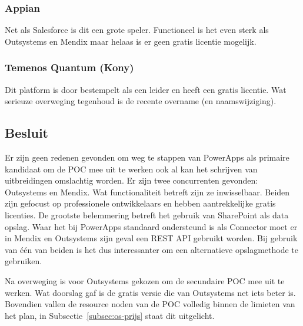 \subsubsection{Appian}

Net als Salesforce is dit een grote speler. Functioneel is het even sterk als Outsystems en Mendix maar helaas is er geen gratis licentie mogelijk.

\subsubsection{Temenos Quantum (Kony)}

Dit platform is door \textcite{Vincent2019} bestempelt als een leider en heeft een gratis licentie. Wat serieuze overweging tegenhoud is de recente overname (en naamswijziging).

\subsection{Besluit}

Er zijn geen redenen gevonden om weg te stappen van PowerApps als primaire kandidaat om de POC mee uit te werken ook al kan het schrijven van uitbreidingen omslachtig worden. Er zijn twee concurrenten gevonden: Outsystems en Mendix. Wat functionaliteit betreft zijn ze inwisselbaar. Beiden zijn gefocust op professionele ontwikkelaars en hebben aantrekkelijke gratis licenties. De grootste belemmering betreft het gebruik van SharePoint als data opslag. Waar het bij PowerApps standaard ondersteund is als Connector moet er in Mendix en Outsystems zijn geval een REST API gebruikt worden. Bij gebruik van één van beiden is het dus interessanter om een alternatieve opslagmethode te gebruiken.

Na overweging is voor Outsystems gekozen om de secundaire POC mee uit te werken. Wat doorslag gaf is de gratis versie die van Outsystems net iets beter is.\\
Bovendien vallen de resource noden van de POC volledig binnen de limieten van het plan, in Subsectie~\ref{subsec:os-prijs} staat dit uitgelicht.


